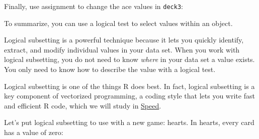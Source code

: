 \documentclass[
  letterpaper,
  DIV=11,
  numbers=noendperiod]{scrbook}
\newenvironment{Shaded}{\begin{snugshade}}{\end{snugshade}}
\newcommand{\DecValTok}[1]{\textcolor[rgb]{0.68,0.00,0.00}{#1}}
\newcommand{\DocumentationTok}[1]{\textcolor[rgb]{0.37,0.37,0.37}{\textit{#1}}}
\newcommand{\FunctionTok}[1]{\textcolor[rgb]{0.28,0.35,0.67}{#1}}
\newcommand{\NormalTok}[1]{\textcolor[rgb]{0.00,0.23,0.31}{#1}}
\newcommand{\OtherTok}[1]{\textcolor[rgb]{0.00,0.23,0.31}{#1}}
\newcommand{\SpecialCharTok}[1]{\textcolor[rgb]{0.37,0.37,0.37}{#1}}
\newcommand{\StringTok}[1]{\textcolor[rgb]{0.13,0.47,0.30}{#1}}
\begin{document}
Finally, use assignment to change the ace values in \texttt{deck3}:

\begin{Shaded}
\end{Shaded}

To summarize, you can use a logical test to select values within an
object.

Logical subsetting is a powerful technique because it lets you quickly
identify, extract, and modify individual values in your data set. When
you work with logical subsetting, you do not need to know \emph{where}
in your data set a value exists. You only need to know how to describe
the value with a logical test.

Logical subsetting is one of the things R does best. In fact, logical
subsetting is a key component of vectorized programming, a coding style
that lets you write fast and efficient R code, which we will study in
\hyperref[sec-speed]{Speed}.

Let's put logical subsetting to use with a new game: hearts. In hearts,
every card has a value of zero:

\begin{Shaded}
\end{Shaded}
\end{document}
